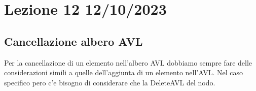 \section{Lezione 12 12/10/2023}
\subsection{Cancellazione albero AVL}

Per la cancellazione di un elemento nell'albero AVL dobbiamo sempre fare delle considerazioni simili a quelle dell'aggiunta di un elemento nell'AVL. Nel caso specifico pero c'e bisogno di considerare che la DeleteAVL del nodo.
